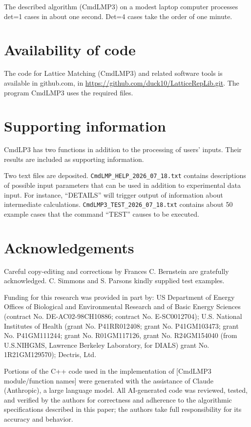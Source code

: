 \documentclass[preprint]{iucr}              %
\numberwithin{equation}{section}
\begin{document}
{The described algorithm (CmdLMP3) on a modest laptop computer
processes det=1 cases in about one second. Det=4
cases take the order of one minute.


\section{Availability of code}

The code for Lattice Matching (CmdLMP3) and related 
software tools is available in github.com, in
\url{https://github.com/duck10/LatticeRepLib.git}.
The program CmdLMP3 uses the required files.

	
\section{Supporting information}

CmdLP3 has two functions in addition to the processing of
users' inputs. Their results are included as supporting
information.

Two text files are deposited. \texttt{CmdLMP\_HELP\_2026\_07\_18.txt}
contains descriptions of possible input parameters that
can be used in addition to experimental data input. For instance,
``DETAILS'' will trigger output of information about intermediate
calculations. 
\texttt{CmdLMP3\_TEST\_2026\_07\_18.txt}
contains about 50 example cases that the command ``TEST''
causes to be executed.


\section{Acknowledgements}

Careful copy-editing and corrections by Frances C. Bernstein are 
gratefully acknowledged. C. Simmons and S. Parsons
kindly supplied test examples.

Funding for this research was provided in part by:  
US Department of Energy Offices of Biological and 
Environmental Research and of Basic Energy Sciences 
(contract No. DE-AC02-98CH10886; contract No. E-SC0012704); 
U.S. National Institutes of Health (grant No. P41RR012408; 
grant No. P41GM103473; grant No. P41GM111244; 
grant No. R01GM117126,
grant No. R24GM154040 (from U.S.NIHGMS, Lawrence Berkeley Laboratory, for DIALS)
grant No. 1R21GM129570); Dectris, Ltd.

Portions of the C++ code used in the implementation of [CmdLMP3 module/function names]
were generated with the assistance of Claude (Anthropic), a large language model.
All AI-generated code was reviewed, tested, and verified by the authors for
correctness and adherence to the algorithmic specifications described in this
paper; the authors take full responsibility for its accuracy and behavior.


}
\end{document}
